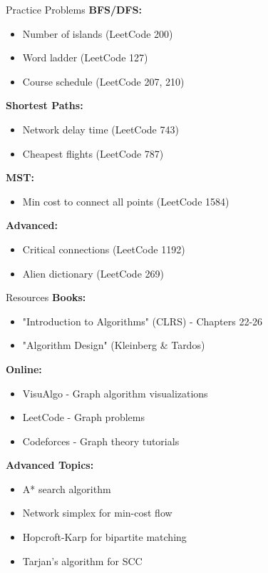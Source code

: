 \documentclass[aspectratio=169]{beamer}
\begin{document}
\begin{frame}{Practice Problems}
  \textbf{BFS/DFS:}
  \begin{itemize}
    \item Number of islands (LeetCode 200)
    \item Word ladder (LeetCode 127)
    \item Course schedule (LeetCode 207, 210)
  \end{itemize}

  \vspace{0.2cm}
  \textbf{Shortest Paths:}
  \begin{itemize}
    \item Network delay time (LeetCode 743)
    \item Cheapest flights (LeetCode 787)
  \end{itemize}

  \vspace{0.2cm}
  \textbf{MST:}
  \begin{itemize}
    \item Min cost to connect all points (LeetCode 1584)
  \end{itemize}

  \vspace{0.2cm}
  \textbf{Advanced:}
  \begin{itemize}
    \item Critical connections (LeetCode 1192)
    \item Alien dictionary (LeetCode 269)
  \end{itemize}
\end{frame}

\begin{frame}{Resources}
  \textbf{Books:}
  \begin{itemize}
    \item "Introduction to Algorithms" (CLRS) - Chapters 22-26
    \item "Algorithm Design" (Kleinberg \& Tardos)
  \end{itemize}

  \vspace{0.3cm}
  \textbf{Online:}
  \begin{itemize}
    \item VisuAlgo - Graph algorithm visualizations
    \item LeetCode - Graph problems
    \item Codeforces - Graph theory tutorials
  \end{itemize}

  \vspace{0.3cm}
  \textbf{Advanced Topics:}
  \begin{itemize}
    \item A* search algorithm
    \item Network simplex for min-cost flow
    \item Hopcroft-Karp for bipartite matching
    \item Tarjan's algorithm for SCC
  \end{itemize}
\end{frame}
\end{document}
